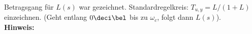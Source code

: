 \begin{question}[section=4,name={Standardregelkreis},difficulty=,type=mdl,tags={}]
	Betragsgang für $L(s)$ war gezeichnet. Standardregelkreis: $T_{u,y} = L/(1+L)$ einzeichnen. (Geht entlang $0\deci\bel$ bis zu $\omega_c$, folgt dann $L(s)$).
	\\ \textbf{Hinweis:}\\
	
\end{question}
\begin{solution}
	
\end{solution}